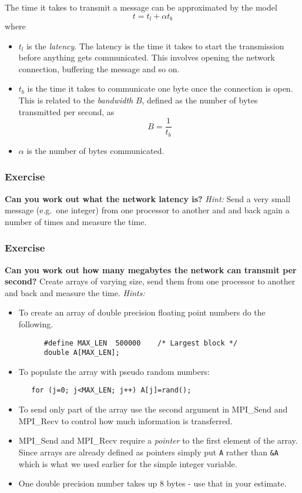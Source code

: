 \documentclass[12pt]{article}
\begin{document}
The time it takes to transmit a message can be approximated by the model
\[
  t = t_l + \alpha t_b
\]
where 
\begin{itemize} 
  \item $t_l$ is the \emph{latency}. The latency is the 
  time it takes to start the transmission before anything 
  gets communicated. This involves opening the network connection,
  buffering the message and so on.
  \item $t_b$ is the time it takes to communicate one byte once 
  the connection is open. This is related to the \emph{bandwidth} $B$, 
  defined as the number of bytes transmitted per second, as
  \[
    B = \frac{1}{t_b}
  \]
  \item $\alpha$ is the number of bytes communicated.
\end{itemize}    

\subsubsection*{Exercise}
\textbf{Can you work out what the network latency is?}
\emph{Hint:} Send a very small message (e.g.\ one integer)
from one processor to another and and back again a number of times 
and measure the time.    

\subsubsection*{Exercise}
\textbf{Can you work out how many megabytes the network can transmit per 
second?} 
Create arrays of varying size, send them from one processor 
to another and back and measure the time.
\emph{Hints:}
\begin{itemize} 
  \item To create an array of double precision floating point numbers 
    do the following.
    \begin{verbatim}
      #define MAX_LEN  500000    /* Largest block */
      double A[MAX_LEN];
    \end{verbatim}
  \item To populate the array with pseudo random numbers:  
  \begin{verbatim} 
   for (j=0; j<MAX_LEN; j++) A[j]=rand();
   \end{verbatim}
   \item To send only part of the array use the second argument in 
   MPI\_Send and MPI\_Recv to control how much information is transferred.
   \item MPI\_Send and MPI\_Recv require a \emph{pointer} to the first 
   element of the array. Since arrays are already defined as pointers
   simply put \texttt{A} rather than \texttt{\&A} which is what 
   we used earlier for the 
   simple integer variable.
   \item One double precision number takes up 8 bytes - use that in your 
   estimate.
\end{itemize} 
\end{document}
